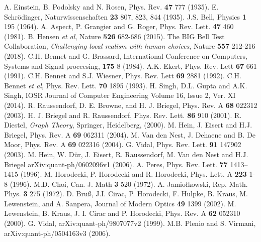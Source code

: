 \documentclass[10pt,a4paper]{book}
\numberwithin{equation}{chapter}
\numberwithin{figure}{chapter}
\numberwithin{table}{chapter}
\begin{document}
\begin{appendices}
\end{appendices}


\begin{thebibliography}{99}
 A. Einstein, B. Podolsky and N. Rosen, Phys. Rev. \textbf{47} 777 (1935).
 E. Schrödinger, Naturwissenschaften \textbf{23} 807, 823, 844 (1935).
 J.S. Bell, Physics \textbf{1} 195 (1964).
 A. Aspect, P. Grangier and G. Roger, Phys. Rev. Lett. \textbf{47} 460 (1981).
 B. Hensen \textit{et al}, Nature \textbf{526} 682-686 (2015).
 The BIG Bell Test Collaboration, \textit{Challenging local realism with human choices}, Nature \textbf{557} 212-216 (2018).
 C.H. Bennet and G. Brassard, International Conference on Computers, Systems and Signal proccesing, \textbf{175} 8 (1984).
 A.K. Ekert, Phys. Rev. Lett \textbf{67} 661 (1991).
 C.H. Bennet and S.J. Wiesner, Phys. Rev. Lett \textbf{69} 2881 (1992).
 C.H. Bennet \textit{et al}, Phys. Rev. Lett. \textbf{70} 1895 (1993).
 H. Singh, D.L. Gupta and A.K. Singh, IOSR Journal of Computer Engineering Volume 16, Issue 2, Ver. XI (2014).
 R. Raussendorf, D. E. Browne, and H. J. Briegel, Phys. Rev. A \textbf{68} 022312 (2003).
 H. J. Briegel and R. Raussendorf, Phys. Rev. Lett. \textbf{86} 910 (2001).
 R. Diestel, \textit{Graph Theory}, Springer, Heidelberg, (2000).
 M. Hein, J. Eisert and H.J. Briegel, Phys. Rev. A \textbf{69} 062311 (2004).
 M. Van den Nest, J. Dehaene and B. De Moor, Phys. Rev. A \textbf{69} 022316 (2004).
 G. Vidal, Phys. Rev. Lett. \textbf{91} 147902 (2003).
 M. Hein, W. Dür, J. Eisert, R. Raussendorf, M. Van den Nest and H.J. Briegel arXiv:quant-ph/0602096v1 (2006).
 A. Peres, Phys. Rev. Lett. \textbf{77} 1413–1415 (1996).
 M. Horodecki, P. Horodecki and R. Horodecki, Phys. Lett. A  \textbf{223} 1-8 (1996).
 M.D. Choi, Can. J. Math \textbf{3} 520 (1972).
 A. Jamiołkowski, Rep. Math. Phys. \textbf{3} 275 (1972).
  D. Bruß, J.I. Cirac, P. Horodecki, F. Hulpke, B. Kraus, M. Lewenstein, and A. Sanpera, Journal of Modern Optics \textbf{49} 1399 (2002).
 M. Lewenstein, B. Kraus, J. I. Cirac and P. Horodecki, Phys. Rev. A \textbf{62} 052310 (2000).
 G. Vidal,  arXiv:quant-ph/9807077v2 (1999).
 M.B. Plenio and S. Virmani, arXiv:quant-ph/0504163v3 (2006).

\end{thebibliography}
\end{document}
